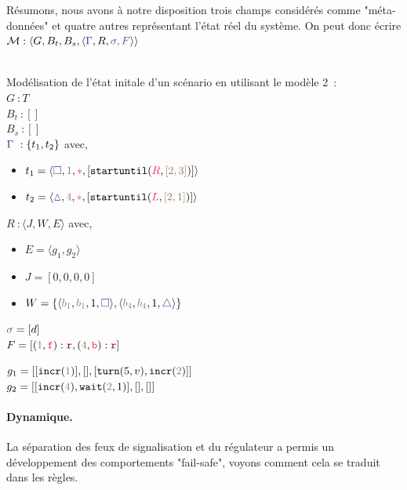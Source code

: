 \documentclass[oneside, a4paper, 11pt]{book}
\newcommand{\trainFmt}[1]{{\color{traincolor} #1}}
\newcommand{\trainTuple}[4]{\langle \trainFmt{#1}, \posFmt{#2}, \dirFmt{#3}, #4 \rangle}
\newcommand{\forward}{\ensuremath{\mathtt{f}}}
\newcommand{\backward}{\ensuremath{\mathtt{b}}}
\newcommand{\dirFmt}[1]{{\color{dircolor} #1}}
\newcommand{\dirForward}{\ensuremath{\dirFmt{\forward}}}
\newcommand{\dirBackward}{\ensuremath{\dirFmt{\backward}}}
\newcommand{\posFmt}[1]{{\color{poscolor}{#1}}}
\newcommand{\bid}[1]{\ensuremath{\posFmt{b_{#1}}}}
\newcommand{\su}[2]{{\mbox{$\mathtt{startuntil}(\dirFmt{#1}, \posFmt{#2})$}}}
\newcommand{\incr}[1]{{\mbox{\ensuremath{\mathtt{incr}(\posFmt{#1})}}}}
\newcommand{\turnOrder}[2]{{\mbox{\ensuremath{\mathtt{turn}(#1, #2)}}}}
\newcommand{\wait}[2]{{\mbox{\ensuremath{\mathtt{wait}(\posFmt{#1}, #2)}}}}
\newcommand{\swFmt}[1]{{\color{swcolor}{#1}}}
\newcommand{\sigred}{{\mbox{${\color{red!50!black}\mathtt{r}}$}}}
\newcommand{\commentaire}[1]{{\color{commentcolor}{#1}}}
\begin{document}
Résumons, nous avons à notre disposition trois champs considérés comme "méta-données" et quatre autres représentant l'état réel du système. On peut donc écrire $\mathcal{M} : \langle G, B_t, B_s, \langle \trainFmt{\Gamma},R,\swFmt{\sigma,F} \rangle \rangle$

\begin{example}[GoodEnding M2]
		~\\
	Modélisation de l'état initale d'un scénario en utilisant le modèle 2~:
	\\$G~: T$
	\vspace{0.3cm}
	\\$B_t~: []$ \commentaire{// vide}
	\vspace{0.3cm}
	\\$B_s~: []$ \commentaire{// vide}
	\vspace{0.3cm}
	\\$\trainFmt{\Gamma}~: \{t_1, t_2\}$ avec,
	\begin{itemize}
		\item[] $t_1 = \trainTuple{\square}{1}{*}{[\su{R}{[2,3]}]}$
		\item[] $t_2 = \trainTuple{\vartriangle}{4}{*}{[\su{L}{[2,1]}]}$
	\end{itemize}
	\vspace{0.3cm}
	$R~: \langle J,W,E \rangle$ avec,	
	\begin{itemize}
		\item[] $E = \langle g_1, g_2 \rangle$
		\item[] $J = [0,0,0,0]$
		\item[] $W = \{\langle \bid{1}, \bid{1}, 1, \trainFmt{\square} \rangle, \langle \bid{4}, \bid{4}, 1, \trainFmt{\triangle} \rangle\}$
	\end{itemize}
	\vspace{0.3cm}
	$\swFmt{\sigma} = [d]$
	\vspace{0.3cm}
	\\$F = [(\posFmt{1},\dirForward) : \sigred,(\posFmt{4},\dirBackward) : \sigred]$ \commentaire{// De base, tous les feux sont au vert}
	\vspace{0.3cm}

	$g_1 = [[\incr{1}],[],[\turnOrder{5}{v}, \incr{2}]]$
	\\$g_2 = [[ \incr{4}, \wait{2}{1}],[],[]]$
\end{example}

\paragraph{Dynamique.}
La séparation des feux de signalisation et du régulateur a permis un développement des comportements "fail-safe", voyons comment cela se traduit dans les règles.
\end{document}
